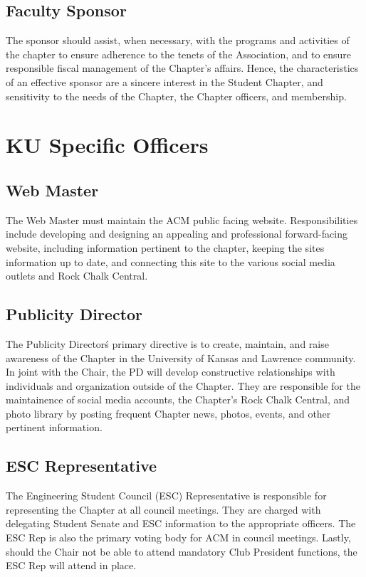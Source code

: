 \subsection*{Faculty Sponsor}
The sponsor should assist, when necessary, with the programs and activities of the chapter to ensure adherence to the tenets of the Association, and to ensure responsible fiscal management of the Chapter's affairs. Hence, the characteristics of an effective sponsor are a sincere interest in the Student Chapter, and sensitivity to the needs of the Chapter, the Chapter officers, and membership.
\section*{KU Specific Officers}
\subsection*{Web Master}
The Web Master must maintain the ACM public facing website. Responsibilities
include developing and designing an appealing and professional forward-facing website, including information pertinent to the chapter, keeping the site\’s information up to date, and connecting this site to the various social media outlets and Rock Chalk Central.
\subsection*{Publicity Director}
The Publicity Director\'s primary directive is to create, maintain, and raise awareness of the Chapter in the University of Kansas and Lawrence community. In joint with the Chair, the PD will develop constructive relationships with individuals and organization outside of the Chapter. They are responsible for the maintainence of social media accounts, the Chapter's Rock Chalk Central, and photo library by posting frequent Chapter news, photos, events, and other pertinent information.
\subsection*{ESC Representative}
The Engineering Student Council (ESC) Representative is responsible for representing the Chapter at all council meetings. They are charged with delegating Student Senate and ESC information to the appropriate officers.  The ESC Rep is also the primary voting body for ACM in council meetings. Lastly, should the Chair not be able to attend mandatory \“Club President\” functions, the ESC Rep will attend in place.

